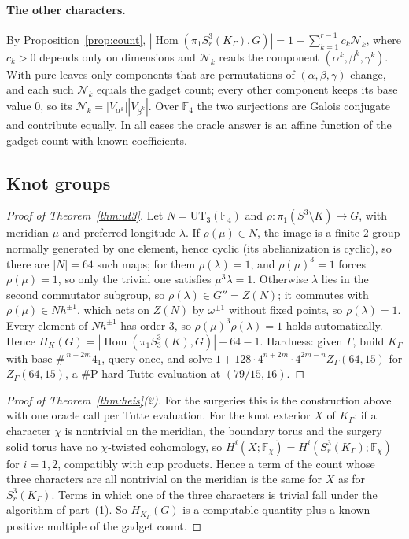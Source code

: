 \documentclass[11pt]{article}
\theoremstyle{definition}
\theoremstyle{remark}
\newcommand{\F}{\mathbb{F}}
\newcommand{\Hom}{\operatorname{Hom}}
\newcommand{\cN}{\mathcal{N}}
\newcommand{\sharpP}{\#\mathrm{P}}
\begin{document}
\paragraph{The other characters.} By Proposition~\ref{prop:count},
$|\Hom(\pi_1S^3_r(K_\Gamma),G)|=1+\sum_{k=1}^{r-1}c_k\cN_k$, where $c_k>0$
depends only on dimensions and $\cN_k$ reads the component
$(\alpha^k,\beta^k,\gamma^k)$. With pure leaves only components that are
permutations of $(\alpha,\beta,\gamma)$ change, and each such $\cN_k$ equals the
gadget count; every other component keeps its base value $0$, so its
$\cN_k=|V_{\alpha^k}||V_{\beta^k}|$. Over $\F_4$ the two surjections are Galois
conjugate and contribute equally. In all cases the oracle answer is an affine
function of the gadget count with known coefficients.

\subsection{Knot groups}

\begin{proof}[Proof of Theorem~\ref{thm:ut3}]
Let $N=\mathrm{UT}_3(\F_4)$ and $\rho\colon\pi_1(S^3\setminus K)\to G$, with
meridian $\mu$ and preferred longitude $\lambda$. If $\rho(\mu)\in N$, the
image is a finite $2$-group normally generated by one element, hence cyclic
(its abelianization is cyclic), so there are $|N|=64$ such maps; for them
$\rho(\lambda)=1$, and $\rho(\mu)^3=1$ forces $\rho(\mu)=1$, so only the trivial
one satisfies $\mu^3\lambda=1$. Otherwise $\lambda$ lies in the second
commutator subgroup, so $\rho(\lambda)\in G''=Z(N)$; it commutes with
$\rho(\mu)\in Nh^{\pm1}$, which acts on $Z(N)$ by $\omega^{\pm1}$ without fixed
points, so $\rho(\lambda)=1$. Every element of $Nh^{\pm1}$ has order $3$, so
$\rho(\mu)^3\rho(\lambda)=1$ holds automatically. Hence
$H_K(G)=|\Hom(\pi_1S^3_3(K),G)|+64-1$. Hardness: given $\Gamma$, build
$K_\Gamma$ with base $\#^{\,n+2m}4_1$, query once, and solve
$1+128\cdot4^{n+2m}\cdot4^{2m-n}Z_\Gamma(64,15)$ for $Z_\Gamma(64,15)$, a
$\sharpP$-hard Tutte evaluation at $(79/15,16)$.
\end{proof}

\begin{proof}[Proof of Theorem~\ref{thm:heis}(2)]
For the surgeries this is the construction above with one oracle call per
Tutte evaluation. For the knot exterior $X$ of $K_\Gamma$: if a character $\chi$ is
nontrivial on the meridian, the boundary torus and the surgery solid torus have
no $\chi$-twisted cohomology, so $H^i(X;\F_\chi)=H^i(S^3_r(K_\Gamma);\F_\chi)$
for $i=1,2$, compatibly with cup products. Hence a term of the count whose three
characters are all nontrivial on the meridian is the same for $X$ as for
$S^3_r(K_\Gamma)$. Terms in which one of
the three characters is trivial fall under the algorithm of part~(1). So
$H_{K_\Gamma}(G)$ is a computable quantity plus a known positive multiple of
the gadget count.
\end{proof}
\end{document}
